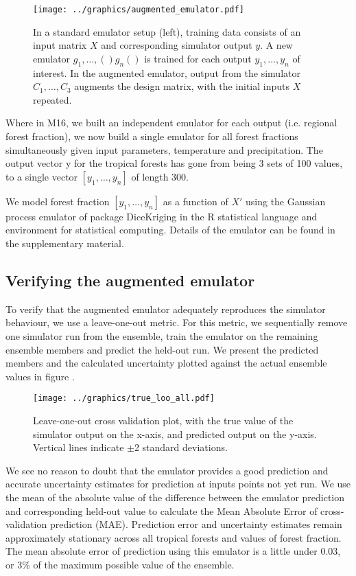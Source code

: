 \documentclass[gmd, manuscript]{copernicus}
\begin{document}
\begin{figure}[t]
\texttt{[image: ../graphics/augmented\_emulator.pdf]}
\caption{In a standard emulator setup (left), training data consists of an input matrix $X$ and corresponding simulator output $y$. A new emulator $g_{1}, \ldots, ()g_{n}()$ is trained for each output $y_{1}, \ldots, y_{n}$ of interest. In the augmented emulator, output from the simulator $C_{1}, \ldots, C_{3}$ augments the design matrix, with the initial inputs $X$ repeated.}
\label{fig:augmented_emulator}
\end{figure}


Where in M16, we built an independent emulator for each output (i.e. regional forest fraction), we now build a single emulator for all forest fractions simultaneously given input parameters, temperature and precipitation. The output vector y for the tropical forests has gone from being 3 sets of 100 values, to a single vector $[y_{1}, \ldots,  y_{n}]$ of length 300.

We model forest fraction $[y_{1}, \ldots, y_{n}]$ as a function of $X'$ using the Gaussian process emulator of package DiceKriging \citep{roustant2012dicekriging} in the R statistical language and environment for statistical computing. Details of the emulator can be found in the supplementary material.

\subsection{Verifying the augmented emulator}
To verify that the augmented emulator adequately reproduces the simulator behaviour, we use a leave-one-out metric. For this metric, we sequentially remove one simulator run from the ensemble, train the emulator on the remaining ensemble members and predict the held-out run. We present the predicted members and the calculated uncertainty plotted against the actual ensemble values in figure \cite{fig:true_loo_all}.

\begin{figure}[t]
\texttt{[image: ../graphics/true\_loo\_all.pdf]}
\caption{Leave-one-out cross validation plot, with the true value of the simulator output on the x-axis, and predicted output on the y-axis. Vertical lines indicate $\pm$2 standard deviations.
}
\label{fig:true_loo_all}
\end{figure}

We see no reason to doubt that the emulator provides a good prediction and accurate uncertainty estimates for prediction at inputs points not yet run. We use the mean of the absolute value of the difference between the emulator prediction and corresponding held-out value to calculate the Mean Absolute Error of cross-validation prediction (MAE). Prediction error and uncertainty estimates remain approximately stationary across all tropical forests and values of forest fraction. The mean absolute error of prediction using this emulator is a little under 0.03, or 3\% of the maximum possible value of the ensemble.
\end{document}
